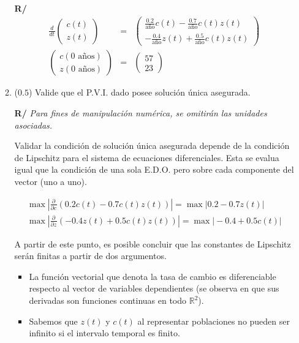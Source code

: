 \documentclass[12pt]{article}
\newcommand{\R}{\ensuremath{\mathbb{R}}}
\newcommand{\diff}[3]{\frac{d^{#3} #1}{d#2^{#3}}}
\newcommand{\pdiff}[3]{\frac{\partial^{#3} #1}{\partial#2^{#3}}}
\begin{document}
\begin{enumerate}[leftmargin=*,widest=9]
\begin{enumerate}[label=\alph*]
\textbf{R/}
    \begin{eqnarray*}
    \diff{}{t}{}\begin{pmatrix} c(t) \\ z(t)
    \end{pmatrix} &=& \begin{pmatrix} \frac{0.2}{\text{año}} c(t) - \frac{0.7}{\text{año}} c(t) z(t) \\ -\frac{0.4}{\text{año}} z(t) + \frac{0.5}{\text{año}} c(t) z(t)
    \end{pmatrix} \\
    \begin{pmatrix} c(0 \text{ años}) \\ z(0 \text{ años})
    \end{pmatrix} &=& \begin{pmatrix} 57 \\ 23 \end{pmatrix}
    \end{eqnarray*}

    \item (\(0.5\)) Valide que el P.V.I. dado posee solución única asegurada.

    \textbf{R/} \textit{Para fines de manipulación numérica, se omitirán las unidades asociadas.}

    Validar la condición de solución única asegurada depende de la condición de Lipschitz para el sistema de ecuaciones diferenciales. Esta se evalua igual que la condición de una sola E.D.O. pero sobre cada componente del vector (uno a uno).

    \begin{eqnarray*}
    \max \left\vert \pdiff{}{c}{} (0.2 c(t) - 0.7 c(t) z(t)) \right\vert = \max \vert 0.2 - 0.7 z(t)\vert \\
    \max \left\vert \pdiff{}{z}{} (-0.4 z(t) + 0.5 c(t) z(t)) \right\vert = \max \vert -0.4 + 0.5 c(t) \vert
    \end{eqnarray*}

    A partir de este punto, es posible concluir que las constantes de Lipschitz serán finitas a partir de dos argumentos.

    \begin{itemize}
\item La función vectorial que denota la tasa de cambio es diferenciable respecto al vector de variables dependientes (se observa en que sus derivadas son funciones continuas en todo \(\R^2\)).
\item Sabemos que \(z(t)\) y \(c(t)\) al representar poblaciones no pueden ser infinito si el intervalo temporal es finito.
    \end{itemize}


\end{enumerate}
\end{enumerate}
\end{document}
